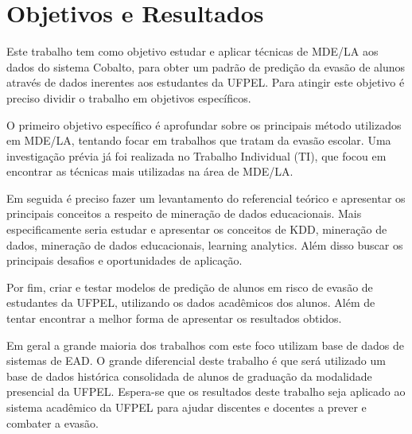 \documentclass[diss-proposta,nocipinfo]{texufpel}
\begin{document}



\chapter{Objetivos e Resultados}


Este trabalho tem como objetivo estudar e aplicar técnicas de MDE/LA aos dados do sistema Cobalto, para obter um padrão de predição da evasão de alunos através de dados inerentes aos estudantes da UFPEL. Para atingir este objetivo é preciso dividir o trabalho em objetivos específicos.


O primeiro objetivo específico é aprofundar sobre os principais método utilizados em MDE/LA, tentando focar em trabalhos que tratam da evasão escolar. Uma investigação prévia já foi realizada no Trabalho Individual (TI), que focou em encontrar as técnicas mais utilizadas na área de MDE/LA.

Em seguida é preciso fazer um levantamento do referencial teórico e apresentar os principais conceitos a respeito de mineração de dados educacionais. Mais especificamente seria estudar e apresentar os conceitos de KDD, mineração de dados, mineração de dados educacionais, learning analytics. Além disso buscar os principais desafios e oportunidades de aplicação.

Por fim, criar e testar modelos de predição de alunos em risco de evasão de estudantes da UFPEL, utilizando os dados acadêmicos dos alunos. Além de tentar encontrar a melhor forma de apresentar os resultados obtidos.

Em geral a grande maioria dos trabalhos com este foco utilizam base de dados de sistemas de EAD. O grande diferencial deste trabalho é que será utilizado um base de dados histórica consolidada de alunos de graduação da modalidade presencial da UFPEL. Espera-se que os resultados deste trabalho seja aplicado ao sistema acadêmico da UFPEL para ajudar discentes e docentes a prever e combater a evasão.
\end{document}

